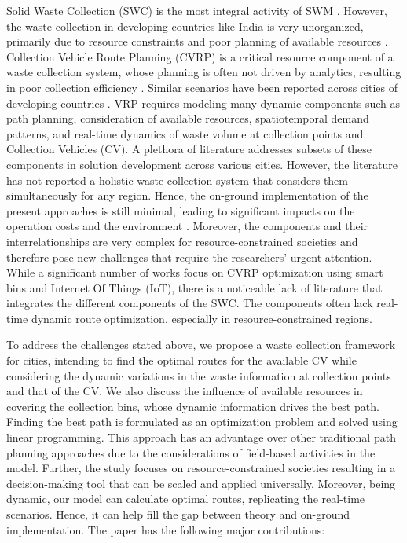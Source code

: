 \documentclass[12pt]{article}
\begin{document}
Solid Waste Collection (SWC) is the most integral activity of SWM \cite{GUPTA2015206}. However, the waste collection in developing countries like India is very unorganized, primarily due to resource constraints and poor planning of available resources \cite{somani2021integrated}. Collection Vehicle Route Planning (CVRP) is a critical resource component of a waste collection system, whose planning is often not driven by analytics, resulting in poor collection efficiency  \cite{akbarpour2021innovative}. Similar scenarios have been reported across cities of developing countries \cite{anagnostopoulos2014effective, anagnostopoulos2015assessing, alwabli2020dynamic}. VRP requires modeling many dynamic components such as path planning, consideration of available resources, spatiotemporal demand patterns, and real-time dynamics of waste volume at collection points and Collection Vehicles (CV). A plethora of literature addresses subsets of these components in solution development across various cities\cite{dugdhe2016efficient,chaudhari2018solid,badve2020garbage}. However, the literature has not reported a holistic waste collection system that considers them simultaneously for any region. Hence, the on-ground implementation of the present approaches is still minimal, leading to significant impacts on the operation costs and the environment \cite{apaydin2007route, han2015waste}. Moreover, the components and their interrelationships are very complex for resource-constrained societies and therefore pose new challenges that require the researchers' urgent attention. While a significant number of works focus on CVRP optimization using smart bins and Internet Of Things (IoT), there is a noticeable lack of literature that integrates the different components of the SWC.  The components often lack real-time dynamic route optimization, especially in resource-constrained regions.

To address the challenges stated above, we propose a waste collection framework for cities, intending to find the optimal routes for the available CV while considering the dynamic variations in the waste information at collection points and that of the CV. We also discuss the influence of available resources in covering the collection bins, whose dynamic information drives the best path. Finding the best path is formulated as an optimization problem and solved using linear programming. This approach has an advantage over other traditional path planning approaches due to the considerations of field-based activities in the model. Further, the study focuses on resource-constrained societies resulting in a decision-making tool that can be scaled and applied universally.
Moreover, being dynamic, our model can calculate optimal routes, replicating the real-time scenarios. Hence, it can help fill the gap between theory and on-ground implementation. The paper has the following major contributions:
\end{document}
